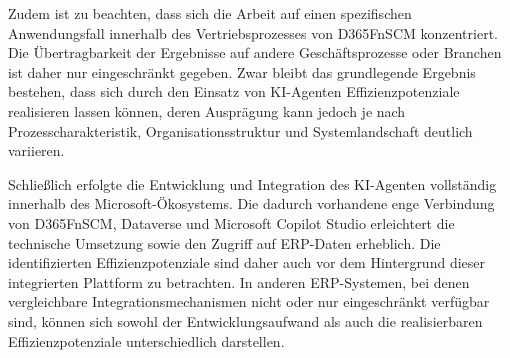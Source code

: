 Zudem ist zu beachten, dass sich die Arbeit auf einen spezifischen Anwendungsfall innerhalb des Vertriebsprozesses von \ac{D365FnSCM} konzentriert. Die Übertragbarkeit der Ergebnisse auf andere Geschäftsprozesse oder Branchen ist daher nur eingeschränkt gegeben. Zwar bleibt das grundlegende Ergebnis bestehen, dass sich durch den Einsatz von \ac{KI}-Agenten Effizienzpotenziale realisieren lassen können, deren Ausprägung kann jedoch je nach Prozesscharakteristik, Organisationsstruktur und Systemlandschaft deutlich variieren.

Schließlich erfolgte die Entwicklung und Integration des \ac{KI}-Agenten vollständig innerhalb des Microsoft-Ökosystems. Die dadurch vorhandene enge Verbindung von \ac{D365FnSCM}, Dataverse und Microsoft Copilot Studio erleichtert die technische Umsetzung sowie den Zugriff auf \ac{ERP}-Daten erheblich. Die identifizierten Effizienzpotenziale sind daher auch vor dem Hintergrund dieser integrierten Plattform zu betrachten. In anderen \ac{ERP}-Systemen, bei denen vergleichbare Integrationsmechanismen nicht oder nur eingeschränkt verfügbar sind, können sich sowohl der Entwicklungsaufwand als auch die realisierbaren Effizienzpotenziale unterschiedlich darstellen.